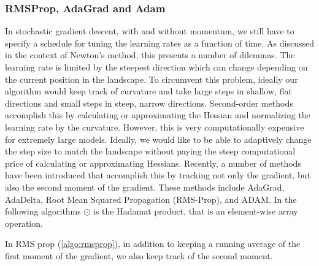 \subsubsection{RMSProp, AdaGrad and Adam}
In stochastic gradient descent, with and without momentum, we still have to
specify a schedule for tuning the learning rates as a function of time.
As discussed in the context of Newton's method, this presents a number of dilemmas.
The learning rate is limited by the steepest direction which can change
depending on the current position in the landscape.
To circumvent this problem, ideally our algorithm would keep track of curvature
and take large steps in shallow, flat directions and small steps in steep,
narrow directions. Second-order methods accomplish this by calculating or
approximating the Hessian and normalizing the learning rate by the curvature.
However, this is very computationally expensive for extremely large models.
Ideally, we would like to be able to adaptively change the step size to match
the landscape without paying the steep computational price of calculating or
approximating Hessians. Recently, a number of methods have been introduced that
accomplish this by tracking not only the gradient, but also the second moment
of the gradient. These methods include AdaGrad, AdaDelta, Root Mean Squared
Propagation (RMS-Prop), and ADAM. In the following algorithms $\odot$ is the
Hadamat product, that is an element-wise array operation.

In RMS prop (\ref{algo:rmsprop}), in addition to keeping a running average of the first moment of
the gradient, we also keep track of the second moment.

